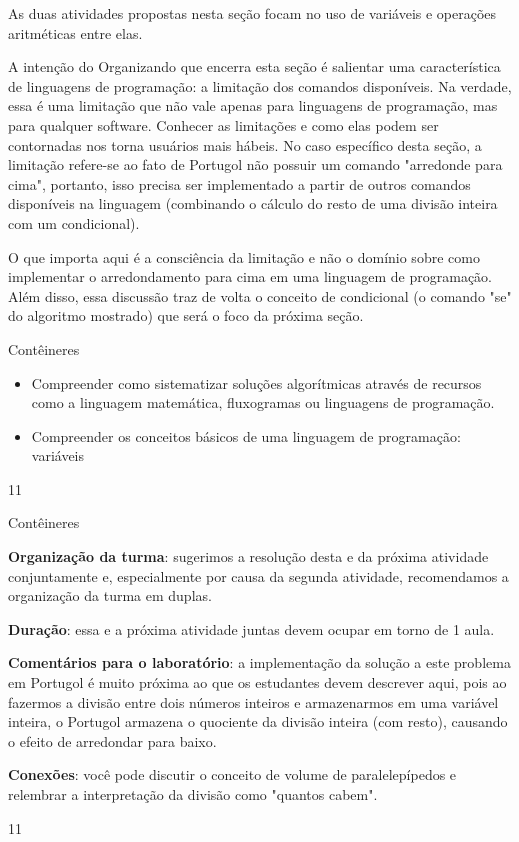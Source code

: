 \def\currentcolor{session1}
\begin{texto}
{
As duas atividades propostas nesta seção focam no uso de variáveis e operações aritméticas entre elas.

A intenção do Organizando que encerra esta seção é salientar uma característica de linguagens de programação: a limitação dos comandos disponíveis. Na verdade, essa é uma limitação que não vale apenas para linguagens de programação, mas para qualquer software. Conhecer as limitações e como elas podem ser contornadas nos torna usuários mais hábeis. No caso específico desta seção, a limitação refere-se ao fato de Portugol não possuir um comando "arredonde para cima", portanto, isso precisa ser implementado a partir de outros comandos disponíveis na linguagem (combinando o cálculo do resto de uma divisão inteira com um condicional).

O que importa aqui é a consciência da limitação e não o domínio sobre como implementar o arredondamento para cima em uma linguagem de programação. Além disso, essa discussão traz de volta o conceito de condicional (o comando "se"{} do algoritmo mostrado) que será o foco da próxima seção.
}
\end{texto}
\marginpar{\vspace{-1em}}
\begin{objectives}{Contêineres}
{
\begin{itemize}
\item Compreender como sistematizar soluções algorítmicas através de recursos como a linguagem matemática, fluxogramas ou linguagens de programação.

\item Compreender os conceitos básicos de uma linguagem de programação: variáveis
\end{itemize}
}{1}{1}
\end{objectives}
\begin{sugestions}{Contêineres}
{
\textbf{Organização da turma}: sugerimos a resolução desta e da próxima atividade conjuntamente e, especialmente por causa da segunda atividade, recomendamos a organização da turma em duplas.

\textbf{Duração}: essa e a próxima atividade juntas devem ocupar em torno de 1 aula.

\textbf{Comentários para o laboratório}: a implementação da solução a este problema em Portugol é muito próxima ao que os estudantes devem descrever aqui, pois ao fazermos a divisão entre dois números inteiros e armazenarmos em uma variável inteira, o Portugol armazena o quociente da divisão inteira (com resto), causando o efeito de arredondar para baixo.

\textbf{Conexões}: você pode discutir o conceito de volume de paralelepípedos e relembrar a interpretação da divisão como "quantos cabem".
}{1}{1}
\end{sugestions}
